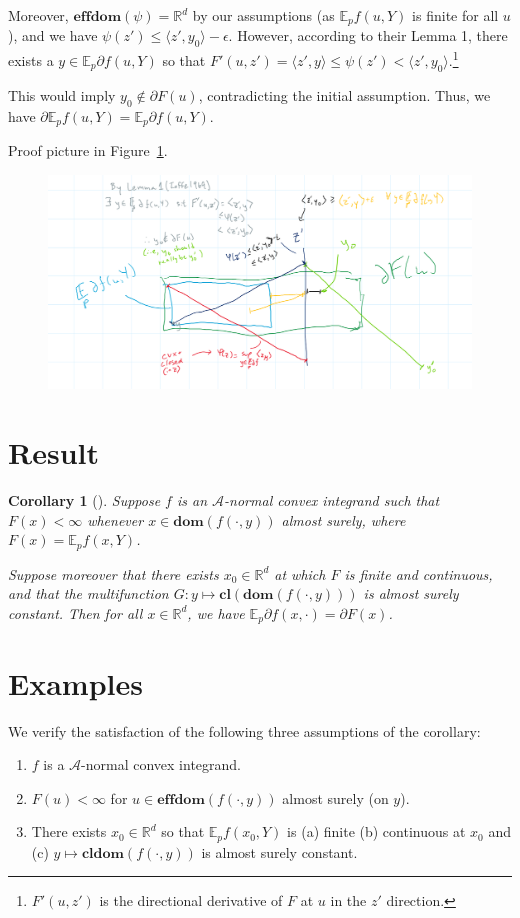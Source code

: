 \documentclass[12pt]{article}
\newcommand{\reals}{\mathbb{R}}
\newcommand{\A}{\mathcal{A}}
\newcommand{\E}{\mathbb{E}}
\newcommand{\cl}{\mathbf{cl}}
\newcommand{\dom}{\mathbf{dom}}
\newcommand{\effdom}{\mathbf{effdom}}
\newtheorem{corollary}{Corollary}
\begin{document}
Moreover, $\effdom (\psi) = \reals^d$ by our assumptions (as $\E_p f(u,Y)$ is finite for all $u$), and we have $\psi(z') \leq \langle z', y_0 \rangle - \epsilon$.
However, according to their Lemma 1, there exists a $y \in \E_p \partial f(u,Y)$ so that $F'(u,z') = \langle z', y \rangle \leq \psi(z') < \langle z', y_0 \rangle$.\footnote{$F'(u,z')$ is the directional derivative of $F$ at $u$ in the $z'$ direction.}

This would imply $y_0 \not \in \partial F(u)$, contradicting the initial assumption.
Thus, we have $\partial \E_p f(u,Y) = \E_p \partial f(u,Y)$. 

Proof picture in Figure~\ref{fig:ioffeproofpic}.
\begin{figure}
	\centering
	\includegraphics[width=0.7\linewidth]{tikz/ioffeproofpic}
	\caption[Picture understanding proof of Ioffe result]{}
	\label{fig:ioffeproofpic}
\end{figure}



\section{Result}
\begin{corollary}[\cite{rockafellar1982interchange}]
	Suppose $f$ is an $\A$-normal convex integrand such that $F(x) < \infty$ whenever $x \in \dom(f(\cdot,y))$ almost surely, where $F(x) = \E_p f(x,Y)$.
	
	Suppose moreover that there exists $x_0 \in \reals^d$ at which $F$ is finite and continuous, and that the multifunction $G: y \mapsto \cl(\dom(f(\cdot,y)))$ is almost surely constant.
	Then for all $x \in \reals^d$, we have $\E_p \partial f(x, \cdot) = \partial F(x)$.
\end{corollary}


\section{Examples}
We verify the satisfaction of the following three assumptions of the corollary:
\begin{enumerate}
	\item $f$ is a $\A$-normal convex integrand.
	\item $F(u) < \infty$ for $u \in \effdom(f(\cdot,y))$ almost surely (on $y$).
	\item There exists $x_0 \in \reals^d$ so that $\E_p f(x_0, Y)$ is (a) finite (b) continuous at $x_0$ and (c) $y \mapsto \cl \dom (f(\cdot, y))$ is almost surely constant.
\end{enumerate}
\end{document}
